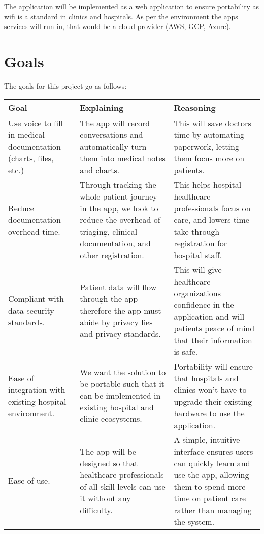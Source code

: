 \documentclass{article}
\begin{document}

The application will be implemented as a web application to ensure portability as wifi is a standard in clinics and hospitals. As per the environment the apps services will run in, that would be a cloud provider (AWS, GCP, Azure). 

\section{Goals}

The goals for this project go as follows:

\begin{table}[h]
    \centering
    \begin{tabular}{p{4cm} p{4cm} p{4cm}}
        \toprule
        \textbf{Goal} & \textbf{Explaining} & \textbf{Reasoning} \\
        \midrule
        Use voice to fill in medical documentation (charts, files, etc.) & The app will record conversations and automatically turn them into medical notes and charts. & This will save doctors time by automating paperwork, letting them focus more on patients. \\ %
        \midrule
        Reduce documentation overhead time.  & Through tracking the whole patient journey in the app, we look to reduce the overhead of triaging, clinical documentation, and other registration.  & This helps hospital healthcare professionals focus on care, and lowers time take through registration for hospital staff.\\ 
        \midrule
        Compliant with data security standards.  & Patient data will flow through the app therefore the app must abide by privacy lies and privacy standards. & This will give healthcare organizations confidence in the application and will patients peace of mind that their information is safe. \\
        \midrule 
        Ease of integration with existing hospital environment. & We want the solution to be portable such that it can be implemented in existing hospital and clinic ecosystems.  & Portability will ensure that hospitals and clinics won’t have to upgrade their existing hardware to use the application. \\
        \midrule 
        Ease of use. & The app will be designed so that healthcare professionals of all skill levels can use it without any difficulty. & A simple, intuitive interface ensures users can quickly learn and use the app, allowing them to spend more time on patient care rather than managing the system. \\
        \bottomrule
    \end{tabular}
\end{table}
\end{document}
